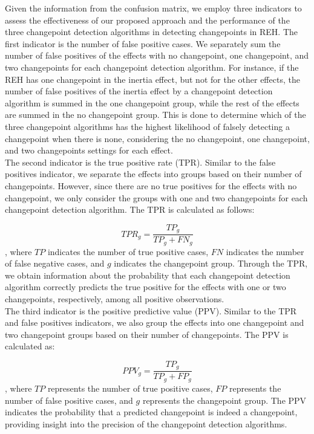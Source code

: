 \documentclass[]{interact}
\theoremstyle{plain}%
\theoremstyle{definition}
\theoremstyle{remark}
\begin{document}
{	Given the information from the confusion matrix, we employ three indicators to assess the effectiveness of our proposed approach and the performance of the three changepoint detection algorithms in detecting changepoints in REH. The first indicator is the number of false positive cases. We separately sum the number of false positives of the effects with no changepoint, one changepoint, and two changepoints for each changepoint detection algorithm. For instance, if the REH has one changepoint in the inertia effect, but not for the other effects, the number of false positives of the inertia effect by a changepoint detection algorithm is summed in the one changepoint group, while the rest of the effects are summed in the no changepoint group. This is done to determine which of the three changepoint algorithms has the highest likelihood of falsely detecting a changepoint when there is none, considering the no changepoint, one changepoint, and two changepoints settings for each effect. \\
	
	The second indicator is the true positive rate (TPR). Similar to the false positives indicator, we separate the effects into groups based on their number of changepoints. However, since there are no true positives for the effects with no changepoint, we only consider the groups with one and two changepoints for each changepoint detection algorithm. The TPR is calculated as follows:
	
	\begin{equation} \label{7}
		TPR_g = \frac{TP_g}{TP_g + FN_g}
	\end{equation}
    , where $TP$ indicates the number of true positive cases, $FN$ indicates the number of false negative cases, and $g$ indicates the changepoint group. Through the TPR, we obtain information about the probability that each changepoint detection algorithm correctly predicts the true positive for the effects with one or two changepoints, respectively, among all positive observations. \\

    The third indicator is the positive predictive value (PPV). Similar to the TPR and false positives indicators, we also group the effects into one changepoint and two changepoint groups based on their number of changepoints. The PPV is calculated as:
 
    \begin{equation} \label{8}
    	PPV_g = \frac{TP_g}{TP_g + FP_g}
    \end{equation}
	, where $TP$ represents the number of true positive cases, $FP$ represents the number of false positive cases, and $g$ represents the changepoint group. The PPV indicates the probability that a predicted changepoint is indeed a changepoint, providing insight into the precision of the changepoint detection algorithms.
	
}
\end{document}
